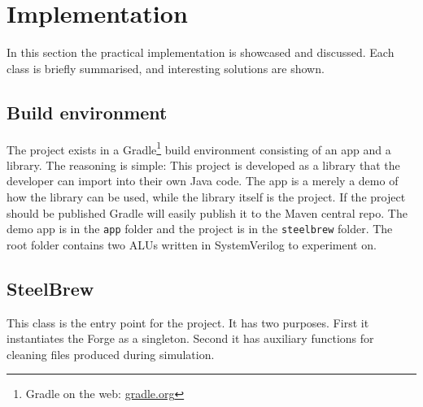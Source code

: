 \section{Implementation}\label{sec:05}
In this section the practical implementation is showcased and discussed. Each class is briefly summarised, and interesting solutions are shown.
\subsection{Build environment}
The project exists in a Gradle\footnote{Gradle on the web: \href{https://gradle.org/}{gradle.org}} build environment consisting of an app and a library. The reasoning is simple: This project is developed as a library that the developer can import into their own Java code. The app is a merely a demo of how the library can be used, while the library itself is the project. If the project should be published Gradle will easily publish it to the Maven central repo. The demo app is in the \texttt{app} folder and the project is in the \texttt{steelbrew} folder. The root folder contains two ALUs written in SystemVerilog to experiment on.
\subsection{SteelBrew}
This class is the entry point for the project. It has two purposes. First it instantiates the Forge as a singleton. Second it has auxiliary functions for cleaning files produced during simulation.
